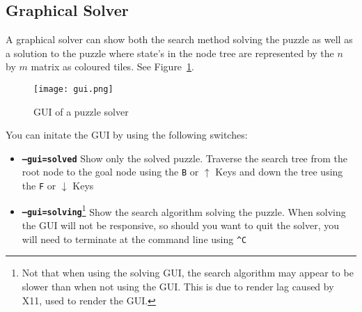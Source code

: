 \subsection{Graphical Solver}
\label{sub:Graphical Solver}

A graphical solver can show both the search method solving the puzzle
as well as a solution to the puzzle where state's in the node tree are
represented by the $n$ by $m$ matrix as coloured tiles. See Figure~\ref{fig:gui}.

\begin{figure}[h!]
  \centering
  \texttt{[image: gui.png]}
  \caption{GUI of a puzzle solver}
  \label{fig:gui}
\end{figure}

You can initate the GUI by using the following switches:

\begin{itemize}
  \item \texttt{\bfseries --gui=solved}
  Show only the solved puzzle. Traverse the search tree from the root node to
  the goal node using the \texttt{B} or $\uparrow$ Keys and down the tree using
  the \texttt{F} or $\downarrow$ Keys
  \item \texttt{\bfseries --gui=solving}\footnote{Not that when using the
  solving GUI, the search algorithm may appear to be slower than when not using
  the GUI. This is due to render lag caused by X11, used to render the GUI.}
  Show the search algorithm solving the puzzle. When solving the GUI will not be
  responsive, so should you want to quit the solver, you will need to terminate
  at the command line using \texttt{\^{}C}
\end{itemize}
